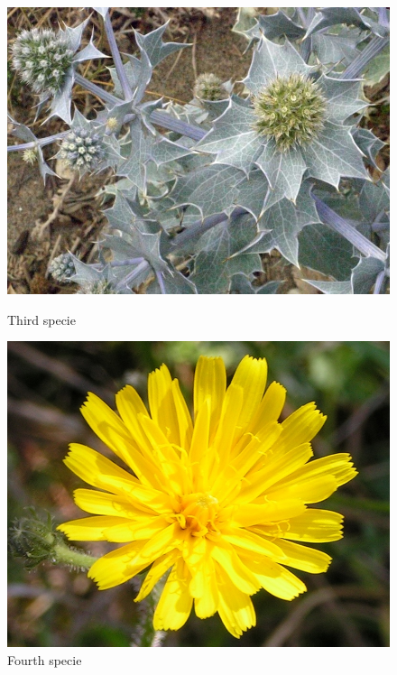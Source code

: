 \documentclass[xcolor=table]{beamer}
\begin{document}
\begin{frame}
  \begin{figure}[htbp]
    \begin{minipage}[c]{.45\linewidth}
      \begin{center}
	\includegraphics[scale=0.20]{4971.jpg}
	\caption{Third specie}
	\label{fig:image6}
      \end{center}
    \end{minipage}
    \hfill
    \begin{minipage}[c]{.45\linewidth}
      \begin{center}
	\includegraphics[scale=0.08]{21604.jpg}
	\caption{Fourth specie}
	\label{fig:image7}
      \end{center}
    \end{minipage}
  \end{figure}

\end{frame}
\end{document}
